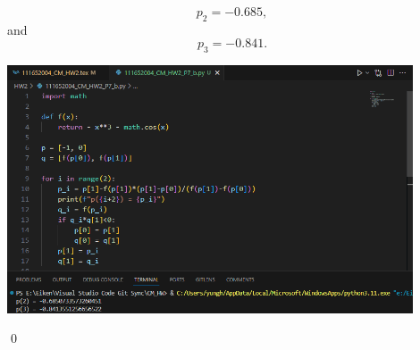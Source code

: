 \documentclass[11pt]{article}
\theoremstyle{break}
\numberwithin{equation}{theorem}
\begin{document}
\begin{enumerate}
    \begin{equation*}
        p_2=-0.685,
    \end{equation*}
    and
    \begin{equation*}
        p_3=-0.841.
    \end{equation*}
    \begin{center}
        \includegraphics[width=0.9\textwidth]{problem_7b_py.png}
    \end{center}
    \qed
\end{enumerate}
\end{document}
